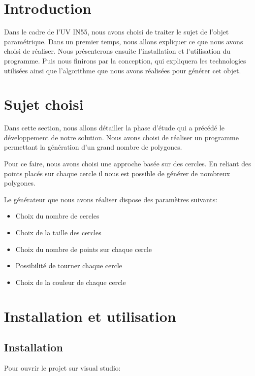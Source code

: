 \documentclass[article, backcover, french, nodocumentinfo]{upmethodology-document}
\begin{document}
	\thispagestyle{empty}
	\upmdocumentsummary{}
	\upmdocumentauthors{}
	\upmdocumentinformedpeople{}
	\upmpublicationpage{}
	\newpage{}
	\tableofcontents{}
	\newpage{}
	\section{Introduction}
		Dans le cadre de l'UV IN55, nous avons choisi de traiter le sujet de l'objet paramétrique.
		Dans un premier temps, nous allons expliquer ce que nous avons choisi de réaliser.
		Nous présenterons ensuite l'installation et l'utilisation du programme.
		Puis nous finirons par la conception, qui expliquera les technologies utilisées ainsi que l'algorithme que nous avons réalisées pour générer cet objet.

	\section{Sujet choisi}
		Dans cette section, nous allons détailler la phase d'étude qui a précédé le développement de notre solution.
		Nous avons choisi de réaliser un programme permettant la génération d'un grand nombre de polygones.
		
		Pour ce faire, nous avons choisi une approche basée sur des cercles.
		En reliant des points placés sur chaque cercle il nous est possible de générer de nombreux polygones.

		Le générateur que nous avons réaliser dispose des paramètres suivants:
		\begin{itemize}
			\item Choix du nombre de cercles
			\item Choix de la taille des cercles
			\item Choix du nombre de points sur chaque cercle
			\item Possibilité de tourner chaque cercle
			\item Choix de la couleur de chaque cercle
		\end{itemize}
	\section{Installation et utilisation}
		\subsection{Installation}
		Pour ouvrir le projet sur visual studio:
\end{document}
